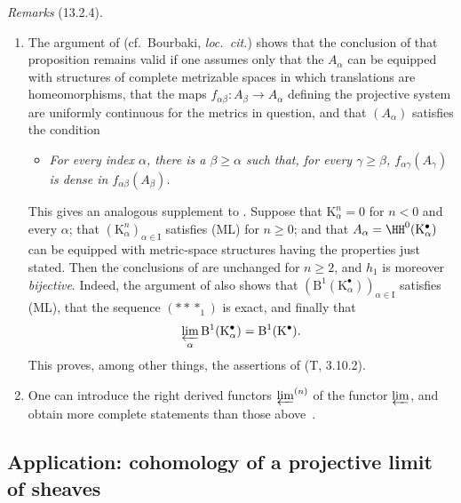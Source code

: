 \begin{env}[13.2.4]
\label{0.13.2.4}
\emph{Remarks} (13.2.4).
\begin{enumerate}
  \item[{\rm(i)}]
  The argument of 
  (cf.\ Bourbaki, \emph{loc.\ cit.}) shows that the conclusion of
  that proposition remains valid if one assumes only that the
  $A_\alpha$ can be equipped with structures of complete metrizable
  spaces in which translations are homeomorphisms, that the maps
  $f_{\alpha\beta}:A_\beta\longrightarrow A_\alpha$ defining the
  projective system are uniformly continuous for the metrics in
  question, and that $(A_\alpha)$ satisfies the condition
  \begin{itemize}
    \item[\textbf{(ML')}]
    \emph{For every index $\alpha$, there is a $\beta\geq\alpha$ such
    that, for every $\gamma\geq\beta$,
    $f_{\alpha\gamma}(A_\gamma)$ is dense in
    $f_{\alpha\beta}(A_\beta)$.}
  \end{itemize}

  This gives an analogous supplement to .
  Suppose that $\mathrm{K}^n_\alpha=0$ for $n<0$ and every $\alpha$;
  that
  $(\mathrm{K}^n_\alpha)_{\alpha\in\mathrm{I}}$ satisfies (ML) for
  $n\geq0$; and that
  $A_\alpha=\HH^0(\mathrm{K}^\bullet_\alpha)$ can be equipped with
  metric-space structures having the properties just stated.
  Then the conclusions of  are unchanged for
  $n\geq2$, and $h_1$ is moreover \emph{bijective}.
  Indeed, the argument of  also shows that
  $(\mathrm{B}^1(\mathrm{K}^\bullet_\alpha))_{\alpha\in\mathrm{I}}$
  satisfies (ML), that the sequence $(***_1)$ is exact, and finally
  that
  \[
    \varprojlim_\alpha
    \mathrm{B}^1(\mathrm{K}^\bullet_\alpha)
    =
    \mathrm{B}^1(\mathrm{K}^\bullet).
  \]
  This proves, among other things, the assertions of (T, 3.10.2).

  \item[{\rm(ii)}]
  One can introduce the right derived functors
  $\varprojlim^{(n)}$ of the functor $\varprojlim$, and obtain more
  complete statements than those above~\cite{III-28}.
\end{enumerate}
\end{env}

\subsection{Application: cohomology of a projective limit of sheaves}
\label{subsection:0.13.3}

